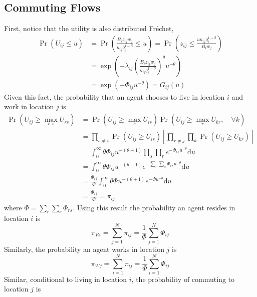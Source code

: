 \documentclass[12pt]{article}
\begin{document}
\subsection{Commuting Flows}
First, notice that the utility is also distributed Fréchet, 
\begin{align*}
    \Pr\left(U_{ij}\leq u\right) &= \Pr\left(\frac{B_iz_{ij}w_j}{\kappa_{ij}q_{i}^{1-\beta}}\leq u\right) 
    = \Pr\left( z_{ij}\leq \frac{u\kappa_{ij}q_i^{1-\beta}}{B_iw_j}\right) \\ 
    &= \exp\left(-\lambda_{ij}\left(\frac{B_iz_{ij}w_j}{\kappa_{ij}q_{i}^{1-\beta}}\right)^\theta u^{-\theta}\right) \\ 
    &= \exp\left(-\Phi_{ij}u^{-\theta}\right) = G_{ij}(u)
\end{align*}
Given this fact, the probability that an agent chooses to live in location $i$ and work in location $j$ is 
\begin{align*}
    \Pr\left(U_{ij}\geq \max_{r,s} U_{rs}\right) &= \Pr\left(U_{ij}\geq \max_{s} U_{is}\right)\Pr\left(U_{ij}\geq \max_{r} U_{kr},\quad\forall k\right) \\ 
    &= \prod_{s\neq i}\Pr\left( U_{ij}\geq U_{is}\right)\left[\prod_{r\neq j}\prod_{k}\Pr\left(U_{ij}\geq U_{kr}\right)\right] \\
    &= \int_0^{\infty}\theta\Phi_{ij}u^{-(\theta+1)}\prod_{s}\prod_{r}e^{-\Phi_{rs}u^{-\theta}} \mathrm{d}u \\ 
    &= \int_0^{\infty}\theta\Phi_{ij}u^{-(\theta+1)}e^{-\sum_{r}\sum_{s}\Phi_{rs}u^{-\theta}} \mathrm{d}u \\ 
    &= \frac{\Phi_{ij}}{\Phi}\int_0^{\infty}\theta\Phi u^{-(\theta+1)}e^{-\Phi u^{-\theta}} \mathrm{d}u \\ 
    &= \frac{\Phi_{ij}}{\Phi} = \pi_{ij}
\end{align*}
where $\Phi=\sum_{r}\sum_{s}\Phi_{rs}$. Using this result the probability an agent resides in location $i$ is 
\begin{equation*}
    \pi_{Ri} = \sum_{j=1}^N \pi_{ij} = \frac{1}{\Phi}\sum_{j=1}^N \Phi_{ij}
\end{equation*}
Similarly, the probability an agent works in location $j$ is
\begin{equation*}
    \pi_{Wj} = \sum_{i=1}^N \pi_{ij} = \frac{1}{\Phi}\sum_{i=1}^N \Phi_{ij}
\end{equation*}
Similar, conditional to living in location $i$, the probability of commuting to location $j$ is
\end{document}
